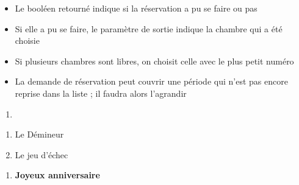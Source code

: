{
}

{\sffamily
{}}

{\sffamily
{}}

{\sffamily
{}}

{\sffamily
{}\textstylePolicepardfauti{
}}


\bigskip

\liststyleListv
\begin{itemize}
\item {
Le booléen retourné indique si la réservation a pu se faire ou pas}
\item {
Si elle a pu se faire, le paramètre de sortie
 indique la chambre qui a été choisie}
\item {
Si plusieurs chambres sont libres, on choisit celle avec le plus petit
numéro}
\item {
La demande de réservation peut couvrir une période qui n’est pas encore
reprise dans la liste ; il faudra alors l’agrandir}
\end{itemize}
\liststyleExercice
\begin{enumerate}
\item {\sffamily\bfseries
{}\textstylePolicepardfauti{
}}
\end{enumerate}
{
}

\liststyleNumberingv
\begin{enumerate}
\item {
Le Démineur}
\item {
Le jeu d’échec}
\end{enumerate}

\bigskip

\liststyleExercice
\begin{enumerate}
\item {\sffamily\bfseries
Joyeux anniversaire}
\end{enumerate}

